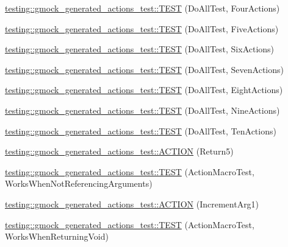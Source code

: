 \begin{DoxyCompactItemize}
\item 
\mbox{\hyperlink{namespacetesting_1_1gmock__generated__actions__test_aa6ed664752eab81abc0c8ec08bc28fe0}{testing\+::gmock\+\_\+generated\+\_\+actions\+\_\+test\+::\+T\+E\+ST}} (Do\+All\+Test, Four\+Actions)
\item 
\mbox{\hyperlink{namespacetesting_1_1gmock__generated__actions__test_adf15fb74ccf2a473a31f0ae733210f3f}{testing\+::gmock\+\_\+generated\+\_\+actions\+\_\+test\+::\+T\+E\+ST}} (Do\+All\+Test, Five\+Actions)
\item 
\mbox{\hyperlink{namespacetesting_1_1gmock__generated__actions__test_af9328f486c8862bfb3a08bd9c0b10a2d}{testing\+::gmock\+\_\+generated\+\_\+actions\+\_\+test\+::\+T\+E\+ST}} (Do\+All\+Test, Six\+Actions)
\item 
\mbox{\hyperlink{namespacetesting_1_1gmock__generated__actions__test_aa1eb8dae72fb173011bf64027f075cea}{testing\+::gmock\+\_\+generated\+\_\+actions\+\_\+test\+::\+T\+E\+ST}} (Do\+All\+Test, Seven\+Actions)
\item 
\mbox{\hyperlink{namespacetesting_1_1gmock__generated__actions__test_a7e7ffc936de010908f42193b951016e3}{testing\+::gmock\+\_\+generated\+\_\+actions\+\_\+test\+::\+T\+E\+ST}} (Do\+All\+Test, Eight\+Actions)
\item 
\mbox{\hyperlink{namespacetesting_1_1gmock__generated__actions__test_ae2037cf34f7bbdb2aa779f31f44c0530}{testing\+::gmock\+\_\+generated\+\_\+actions\+\_\+test\+::\+T\+E\+ST}} (Do\+All\+Test, Nine\+Actions)
\item 
\mbox{\hyperlink{namespacetesting_1_1gmock__generated__actions__test_a11cc35bfa98278915c040aac2329b4a7}{testing\+::gmock\+\_\+generated\+\_\+actions\+\_\+test\+::\+T\+E\+ST}} (Do\+All\+Test, Ten\+Actions)
\item 
\mbox{\hyperlink{namespacetesting_1_1gmock__generated__actions__test_a1275b0757e9f1caf70fbc23da141acd3}{testing\+::gmock\+\_\+generated\+\_\+actions\+\_\+test\+::\+A\+C\+T\+I\+ON}} (Return5)
\item 
\mbox{\hyperlink{namespacetesting_1_1gmock__generated__actions__test_a6a73da775945f4294d9377b0110bb237}{testing\+::gmock\+\_\+generated\+\_\+actions\+\_\+test\+::\+T\+E\+ST}} (Action\+Macro\+Test, Works\+When\+Not\+Referencing\+Arguments)
\item 
\mbox{\hyperlink{namespacetesting_1_1gmock__generated__actions__test_a960f5a5ca2b6a95ce1f3f1673b90d02d}{testing\+::gmock\+\_\+generated\+\_\+actions\+\_\+test\+::\+A\+C\+T\+I\+ON}} (Increment\+Arg1)
\item 
\mbox{\hyperlink{namespacetesting_1_1gmock__generated__actions__test_accde1673541c5076b0e09b3f1914c9d2}{testing\+::gmock\+\_\+generated\+\_\+actions\+\_\+test\+::\+T\+E\+ST}} (Action\+Macro\+Test, Works\+When\+Returning\+Void)

\end{DoxyCompactItemize}
